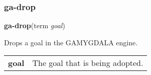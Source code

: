 \subsubsection{ga-drop}

\textbf{ga-drop}(term \emph{goal})

Drops a goal in the GAMYGDALA engine. \\

\begin{tabular}{l l}
	\textbf{goal} & The goal that is being adopted.\\
\end{tabular}